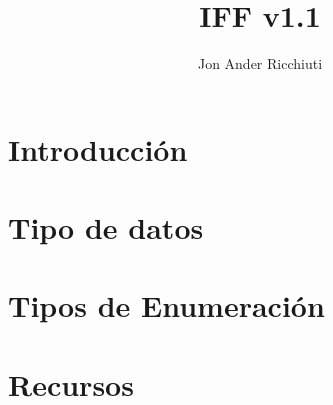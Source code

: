 \documentclass[12pt,letterpaper]{article}
\author{Jon Ander Ricchiuti}
\title{IFF v1.1}
\begin{document}
\maketitle
\thispagestyle{empty}
\newpage
\section*{Introducción}
	
\newpage
\section{Tipo de datos}

\section{Tipos de Enumeración}
	
\section{Recursos}

\end{document}
